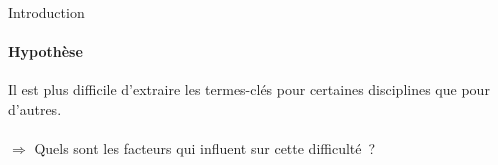   \begin{frame}{Introduction}
    \framesubtitle{Hypothèse}

    Il est plus difficile d'extraire les termes-clés pour certaines disciplines
    que pour d'autres.\\~\\
    $\Rightarrow$ Quels sont les facteurs qui influent sur cette difficulté~?
  \end{frame}

